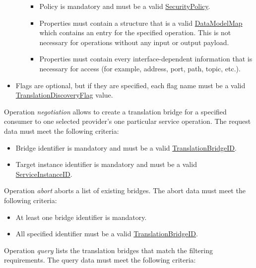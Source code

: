 \documentclass[a4paper]{arrowhead}
\newcommand{\pref}[1]{{\textcolor{ArrowheadGrey}{\hyperref[sec:model:primitives:#1]{#1}}}}
\begin{document}
\begin{itemize}
\begin{itemize}
\begin{itemize}
            \item Policy is mandatory and must be a valid \pref{SecurityPolicy}.
            \item Properties must contain a structure that is a valid \hyperref[sec:model:DataModelMap]{DataModelMap} which contains an entry for the specified operation. This is not necessary for operations without any input or output payload.
            \item Properties must contain every interface-dependent information that is necessary for access (for example, address, port, path, topic, etc.).
        \end{itemize}
    \end{itemize}
    \item Flags are optional, but if they are specified, each flag name must be a valid \pref{TranslationDiscoveryFlag} value.
\end{itemize}


Operation \textit{negotiation} allows to create a translation bridge for a specified consumer to one selected provider's one particular service operation. The request data must meet the following criteria:

\begin{itemize}
    \item Bridge identifier is mandatory and must be a valid \pref{TranslationBridgeID}.
    \item Target instance identifier is mandatory and must be a valid \pref{ServiceInstanceID}.
\end{itemize}


Operation \textit{abort} aborts a list of existing bridges. The abort data must meet the following criteria:

\begin{itemize}
    \item At least one bridge identifier is mandatory.
    \item All specified identifier must be a valid \pref{TranslationBridgeID}.
\end{itemize}


Operation \textit{query} lists the translation bridges that match the filtering requirements. The query data must meet the following criteria:
\end{document}
